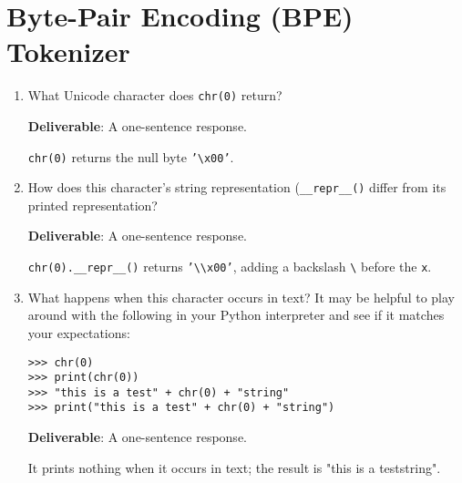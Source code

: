 \section{Byte-Pair Encoding (BPE) Tokenizer}
\vspace{-1em}


\begin{enumerate}[label=(\alph*)]
    \item {What Unicode character does \texttt{chr(0)} return?}
    
    {\textbf{Deliverable}: A one-sentence response.}
    
    \begin{answer}
    \texttt{chr(0)} returns the null byte \texttt{'\textbackslash x00'}.
    \end{answer}
    
    \item {How does this character's string representation (\texttt{\_\_repr\_\_()} differ from its printed representation?}
    
    {\textbf{Deliverable}: A one-sentence response.}
    
    \begin{answer}
    \texttt{chr(0).\_\_repr\_\_()} returns \texttt{'\textbackslash\textbackslash x00'}, adding a backslash \texttt{\textbackslash} before the \texttt{x}.
    \end{answer}
    
    \item {What happens when this character occurs in text? It may be helpful to play around with the following in your Python interpreter and see if it matches your expectations:}
    
    \begin{lstlisting}
>>> chr(0)
>>> print(chr(0))
>>> "this is a test" + chr(0) + "string"
>>> print("this is a test" + chr(0) + "string")
    \end{lstlisting}
    
    {\textbf{Deliverable}: A one-sentence response.}
    
    \begin{answer}
    It prints nothing when it occurs in text; the result is "this is a teststring".
    \end{answer}
\end{enumerate}


